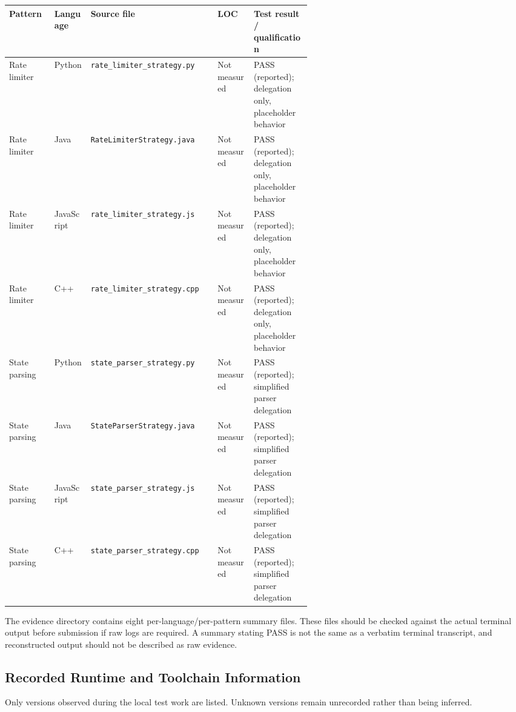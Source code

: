 \documentclass[11pt,a4paper]{article}
\newcommand{\code}[1]{\texttt{#1}}
\begin{document}
\begin{center}
\scriptsize
\begin{tabularx}{\linewidth}{@{}p{0.15\linewidth}p{0.12\linewidth}X p{0.12\linewidth}p{0.19\linewidth}@{}}
\toprule
Pattern & Language & Source file & LOC & Test result / qualification\\
\midrule
Rate limiter & Python & \code{rate\_limiter\_strategy.py} & Not measured & PASS (reported); delegation only, placeholder behavior\\
Rate limiter & Java & \code{RateLimiterStrategy.java} & Not measured & PASS (reported); delegation only, placeholder behavior\\
Rate limiter & JavaScript & \code{rate\_limiter\_strategy.js} & Not measured & PASS (reported); delegation only, placeholder behavior\\
Rate limiter & C++ & \code{rate\_limiter\_strategy.cpp} & Not measured & PASS (reported); delegation only, placeholder behavior\\
State parsing & Python & \code{state\_parser\_strategy.py} & Not measured & PASS (reported); simplified parser delegation\\
State parsing & Java & \code{StateParserStrategy.java} & Not measured & PASS (reported); simplified parser delegation\\
State parsing & JavaScript & \code{state\_parser\_strategy.js} & Not measured & PASS (reported); simplified parser delegation\\
State parsing & C++ & \code{state\_parser\_strategy.cpp} & Not measured & PASS (reported); simplified parser delegation\\
\bottomrule
\end{tabularx}
\end{center}

The evidence directory contains eight per-language/per-pattern summary files. These files should be checked against the actual terminal output before submission if raw logs are required. A summary stating PASS is not the same as a verbatim terminal transcript, and reconstructed output should not be described as raw evidence.

\subsection{Recorded Runtime and Toolchain Information}
Only versions observed during the local test work are listed. Unknown versions remain unrecorded rather than being inferred.
\end{document}
